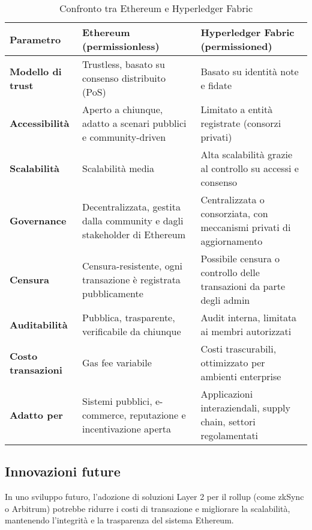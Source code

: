             \begin{table}[H]
                \centering
                \begin{tabular}{|l|p{4cm}|p{4cm}|}
                \hline
                \textbf{Parametro} & \textbf{Ethereum (permissionless)} & \textbf{Hyperledger Fabric (permissioned)} \\
                \hline
                \textbf{Modello di trust} & Trustless, basato su consenso distribuito (PoS) & Basato su identità note e fidate \\
                \hline
                \textbf{Accessibilità} & Aperto a chiunque, adatto a scenari pubblici e community-driven & Limitato a entità registrate (consorzi privati) \\
                \hline
                \textbf{Scalabilità} & Scalabilità media & Alta scalabilità grazie al controllo su accessi e consenso \\
                \hline
                \textbf{Governance} & Decentralizzata, gestita dalla community e dagli stakeholder di Ethereum & Centralizzata o consorziata, con meccanismi privati di aggiornamento \\
                \hline
                \textbf{Censura} & Censura-resistente, ogni transazione è registrata pubblicamente & Possibile censura o controllo delle transazioni da parte degli admin \\
                \hline
                \textbf{Auditabilità} & Pubblica, trasparente, verificabile da chiunque & Audit interna, limitata ai membri autorizzati \\
                \hline
                \textbf{Costo transazioni} & Gas fee variabile & Costi trascurabili, ottimizzato per ambienti enterprise \\
                \hline
                \textbf{Adatto per} & Sistemi pubblici, e-commerce, reputazione e incentivazione aperta & Applicazioni interaziendali, supply chain, settori regolamentati \\
                \hline
                \end{tabular}
                \caption{Confronto tra Ethereum e Hyperledger Fabric}
            \end{table}

        \subsection{Innovazioni future}
            In uno sviluppo futuro, l'adozione di soluzioni Layer 2 per il rollup (come zkSync o Arbitrum) potrebbe ridurre i costi di transazione e migliorare la scalabilità, mantenendo l'integrità e la trasparenza del sistema Ethereum.

